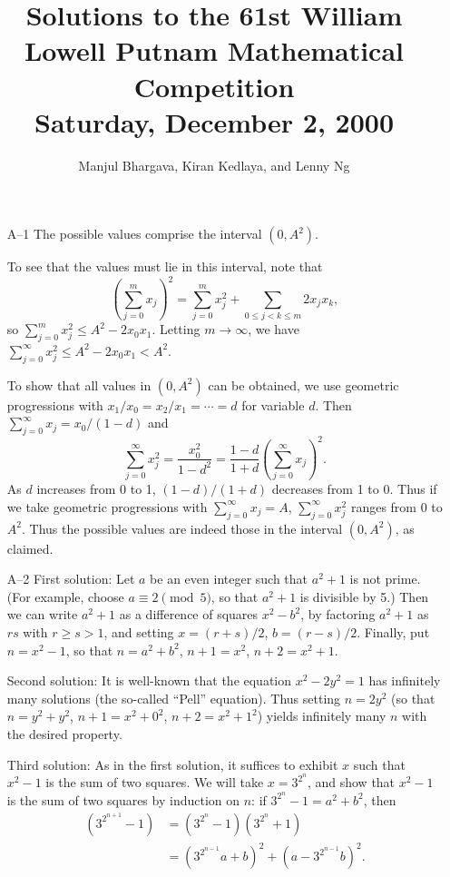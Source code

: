 \documentclass[amssymb,twocolumn,pra,10pt,aps]{revtex4-1}
\begin{document}
\title{Solutions to the 61st William Lowell Putnam Mathematical Competition \\
    Saturday, December 2, 2000}
\author{Manjul Bhargava, Kiran Kedlaya, and Lenny Ng}
\noaffiliation
\maketitle

\begin{itemize}

\item[A--1]
The possible values comprise the interval $(0, A^2)$.

To see that the values must lie in this interval, note that
\[
\left(\sum_{j=0}^m x_j\right)^2
= \sum_{j=0}^m x_j^2 + \sum_{0\leq j<k\leq m} 2x_jx_k,
\]
so $\sum_{j=0}^m x_j^2 \leq A^2 - 2x_0x_1$. Letting $m \to \infty$,
we have $\sum_{j=0}^\infty x_j^2 \leq A^2-2x_0x_1 < A^2$.

To show that all values in $(0, A^2)$ can be obtained, we
use geometric progressions with $x_1/x_0 = x_2/x_1 = \cdots = d$
for variable $d$.
Then $\sum_{j=0}^\infty x_j = x_0/(1-d)$ and
\[
\sum_{j=0}^\infty x_j^2 = \frac{x_0^2}{1-d^2} = \frac{1-d}{1+d} \left(
\sum_{j=0}^\infty x_j \right)^2.
\]
As $d$ increases from 0 to 1, $(1-d)/(1+d)$ decreases from 1 to 0.
Thus if we take geometric progressions with $\sum_{j=0}^\infty
x_j = A$, $\sum_{j=0}^\infty x_j^2$ ranges from 0 to $A^2$.
Thus the possible values are indeed those in the interval $(0, A^2)$,
as claimed.

\item[A--2]
First solution:
Let $a$ be an even integer such that $a^2+1$ is not prime. (For example,
choose $a \equiv 2 \pmod{5}$, so that $a^2+1$ is divisible by 5.)
Then we can write $a^2+1$ as a difference of squares $x^2-b^2$,
by factoring $a^2+1$ as $rs$ with $r \geq s > 1$, and setting $x
= (r+s)/2$, $b = (r-s)/2$.
Finally, put $n=x^2-1$, so that $n=a^2+b^2$, $n+1 = x^2$, $n+2 = x^2+1$.

Second solution:
It is well-known that the equation $x^2-2y^2=1$ has infinitely
many solutions (the so-called ``Pell'' equation).  Thus setting
$n=2y^2$ (so that $n=y^2+y^2$, $n+1=x^2+0^2$, $n+2=x^2+1^2$)
yields infinitely many $n$ with the desired property.

Third solution:
As in the first solution, it suffices to exhibit $x$ such that $x^2-1$
is the sum of two squares. We will take $x=3^{2^n}$, and show that $x^2-1$
is the sum of two squares by induction on $n$: if $3^{2^n}-1 = a^2+b^2$,
then
\begin{align*}
(3^{2^{n+1}}-1) &= (3^{2^n} - 1)(3^{2^n}+1) \\
&= (3^{2^{n-1}}a+b)^2 + (a-3^{2^{n-1}}b)^2.
\end{align*}


\end{itemize}
\end{document}
